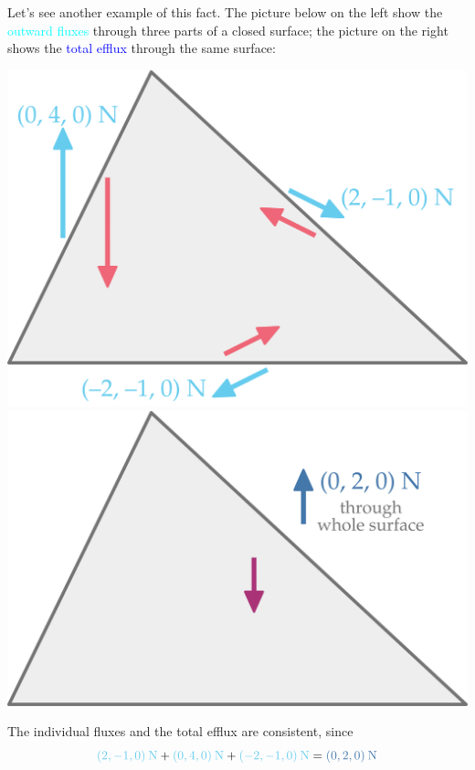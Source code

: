 \documentclass[a4paper,12pt,%
onecolumn,oneside,titlepage,%
british%
]{memoir}
\renewcommand*{\|}[1][]{\nonscript\:#1\vert\nonscript\:\mathopen{}}
\begin{document}
Let's see another example of this fact. The picture below on the left show the \textcolor{cyan}{outward fluxes} through three parts of a closed surface; the picture on the right shows the \textcolor{blue}{total efflux} through the same surface:
\begin{center}
  \hspace*{\fill}
  \includegraphics[align=t,width=0.4\linewidth]{images/flux_closed_3.pdf}
  \hfill
  \includegraphics[align=t,width=0.4\linewidth]{images/flux_closed_3_sum.pdf}
  \hspace*{\fill}
\end{center}
The individual fluxes and the total efflux are consistent, since
\begin{equation*}
  \mathcolor{cyan}{(2,-1,0)\:\unit{N}} +
  \mathcolor{cyan}{(0,4,0)\:\unit{N}} +
  \mathcolor{cyan}{(-2,-1,0)\:\unit{N}} =
  \mathcolor{blue}{(0,2,0)\:\unit{N}}
\end{equation*}



\bigskip
\end{document}
